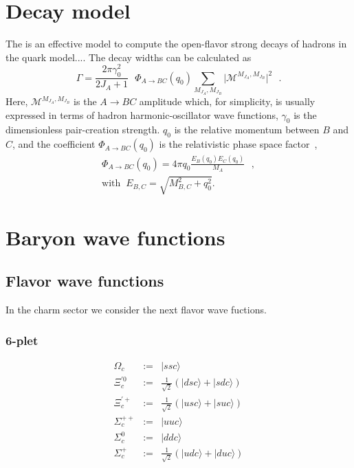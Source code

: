 \documentclass[twocolumn,superscriptaddress,preprintnumbers,nofootinbib]{revtex4}
\begin{document}
\appendix

\section{ Decay model}
\label{app2}
The  is an effective model to compute the open-flavor strong decays of hadrons in the quark model....
The decay widths can be calculated as \cite{Micu:1968mk,LeYaouanc:1972vsx,Ferretti:2015ada}
\begin{equation}
	\Gamma = \frac{2 \pi \gamma_0^2}{2J_{A}+1} \mbox{ } \Phi_{A \rightarrow BC}(q_0)\sum_{M_{J_A},M_{J_B}} \big|\mathcal{M}^{M_{J_A},M_{J_B}}\big|^2 \mbox{ }.  \nonumber
        \label{gamma}
\end{equation}
Here, $\mathcal{M}^{M_{J_A},M_{J_B}}$ is the $A \rightarrow BC$ amplitude which, for simplicity, is usually expressed in terms of hadron harmonic-oscillator wave functions, $\gamma_0$ is the dimensionless pair-creation strength. 
$q_0$ is the relative momentum between $B$ and $C$, and the coefficient $\Phi_{A \rightarrow BC}(q_0)$ is the relativistic phase space factor~\cite{Ferretti:2015ada},
\begin{eqnarray}
	\label{eqn:rel-PSF}
	\Phi_{A \rightarrow BC}(q_0) = 4 \pi q_0 \frac{E_B(q_0) E_C(q_0)}{M_A}  \mbox{ }, \nonumber\\
	\mbox{with}\;\;E_{B,C} = \sqrt{M_{B,C}^2 + q_0^2}.  \nonumber
\end{eqnarray}

 \section{Baryon wave functions}
\subsection{Flavor wave functions}
In the charm sector we consider the next flavor wave fuctions.
\subsubsection{\bf 6-plet}
\begin{eqnarray}
\Omega_c&:=&|ssc\rangle\\
\Xi^{\prime0}_c&:=&\frac{1}{\sqrt{2}}(|dsc\rangle+|sdc\rangle)\\
\Xi^{\prime+}_c&:=&\frac{1}{\sqrt{2}}(|usc\rangle+|suc\rangle)\\
\Sigma^{++}_c&:=&|uuc\rangle\\
\Sigma^0_c&:=&|ddc\rangle\\
\Sigma^+_c&:=&\frac{1}{\sqrt{2}}(|udc\rangle+|duc\rangle)
\end{eqnarray}
\end{document}
